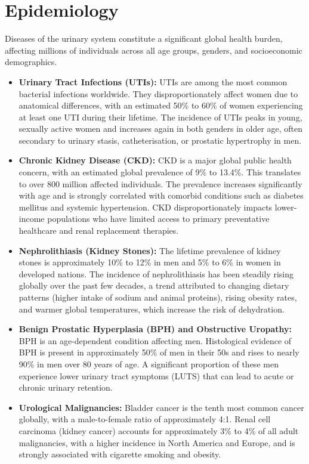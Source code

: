 \section*{Epidemiology}
Diseases of the urinary system constitute a significant global health burden, affecting millions of individuals across all age groups, genders, and socioeconomic demographics.

\begin{itemize}
    \item \textbf{Urinary Tract Infections (UTIs):} UTIs are among the most common bacterial infections worldwide. They disproportionately affect women due to anatomical differences, with an estimated 50\% to 60\% of women experiencing at least one UTI during their lifetime. The incidence of UTIs peaks in young, sexually active women and increases again in both genders in older age, often secondary to urinary stasis, catheterisation, or prostatic hypertrophy in men.
    \item \textbf{Chronic Kidney Disease (CKD):} CKD is a major global public health concern, with an estimated global prevalence of 9\% to 13.4\%. This translates to over 800 million affected individuals. The prevalence increases significantly with age and is strongly correlated with comorbid conditions such as diabetes mellitus and systemic hypertension. CKD disproportionately impacts lower-income populations who have limited access to primary preventative healthcare and renal replacement therapies.
    \item \textbf{Nephrolithiasis (Kidney Stones):} The lifetime prevalence of kidney stones is approximately 10\% to 12\% in men and 5\% to 6\% in women in developed nations. The incidence of nephrolithiasis has been steadily rising globally over the past few decades, a trend attributed to changing dietary patterns (higher intake of sodium and animal proteins), rising obesity rates, and warmer global temperatures, which increase the risk of dehydration.
    \item \textbf{Benign Prostatic Hyperplasia (BPH) and Obstructive Uropathy:} BPH is an age-dependent condition affecting men. Histological evidence of BPH is present in approximately 50\% of men in their 50s and rises to nearly 90\% in men over 80 years of age. A significant proportion of these men experience lower urinary tract symptoms (LUTS) that can lead to acute or chronic urinary retention.
    \item \textbf{Urological Malignancies:} Bladder cancer is the tenth most common cancer globally, with a male-to-female ratio of approximately 4:1. Renal cell carcinoma (kidney cancer) accounts for approximately 3\% to 4\% of all adult malignancies, with a higher incidence in North America and Europe, and is strongly associated with cigarette smoking and obesity.
\end{itemize}

